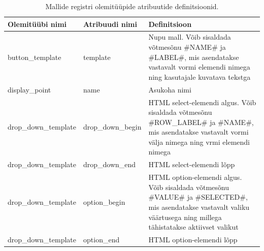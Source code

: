 \documentclass[a4paper,12pt]{article} %
\begin{document}
\begin{table}[H]
\centering
\caption{Mallide registri olemitüüpide atribuutide definitsioonid.}
\label{table_er_mallide_registri_olemitüüpide_atribuutide_definitsioonid}
\begin{tabular}{|p{5cm}|p{5cm}|p{5cm}|}
\hline
\rowcolor{rowgray}
Olemitüübi nimi & Atribuudi nimi & Definitsioon \\ \hline
button\_template & template & Nupu mall. Võib sisaldada võtmesõnu \#NAME\# ja \#LABEL\#, mis asendatakse vastavalt vormi elemendi nimega ning kasutajale kuvatava tekstga  \\ \hline
display\_point & name & Asukoha nimi \\ \hline
drop\_down\_template & drop\_down\_begin & HTML select-elemendi algus. Võib sisaldada võtmesõnu \#ROW\_LABEL\# ja \#NAME\#, mis asendatakse vastavalt vormi välja nimega ning vrmi elemendi nimega \\ \hline
drop\_down\_template & drop\_down\_end & HTML select-elemendi lõpp \\ \hline
drop\_down\_template & option\_begin & HTML option-elemendi algus. Võib sisaldada võtmesõnu \#VALUE\# ja \#SELECTED\#, mis asendatakse vastavalt valiku väärtusega ning millega tähistatakse aktiivset valikut\\ \hline
drop\_down\_template & option\_end & HTML option-elemendi lõpp \\ \hline
\end{tabular}
\end{table}
\end{document}
